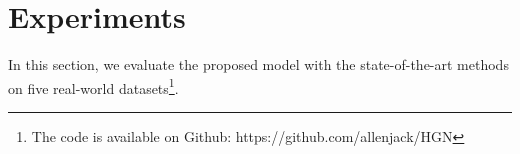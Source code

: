 \documentclass[sigconf]{acmart}
\begin{document}
\begin{comment}

\begin{algorithm}
  \textbf{Input}: $ \mathbf{X} $, $ \mathbf{R} $, $ \mathbf{C}^{(c)} $, $ \mathbf{C}^{(r)} $, $ \mathbf{P} $ \;
Initialize parameters $ \mathbf{W}_{*} $, $ \mathbf{w}_{t} $, $ \mathbf{b}_{*} $ \;
  numBatches = $ N $ $/$ $ batchSize $ \;
  \Repeat {convergence} {
    Shuffle($ \mathbf{X} $, $ \mathbf{R} $, $ \mathbf{C}^{(c)} $, $ \mathbf{C}^{(r)} $, $ \mathbf{P} $) \;
    \For{batch = 0; batch < numBatches; batch++} {
      $ \mathbf{X}_{batch}, \mathbf{R}_{batch}, \mathbf{C}_{batch}^{(c)}, \mathbf{C}_{batch}^{(r)} $ = ExtractBatchData(batch, $ \mathbf{X} $, $ \mathbf{R} $, $ \mathbf{C}^{(c)} $, $ \mathbf{C}^{(r)} $) \;
      For each item $ i $ in $ \mathbf{X}_{batch} $, apply Eq. \ref{eq:slice_operation} to get $ \mathbf{W}_{1}[D_{i}] $ \;
      Apply Eq. \ref{eq:attention_matrix}, Eq. \ref{eq:item_embedding_matrix} and Eq. \ref{eq:item_content_embedding} to get $ \mathbf{z}_{i}^{c} $ \;
      For each item $ i $ in $ \mathbf{R}_{batch} $, apply Eq. \ref{eq:rating_AE} to get $ \mathbf{z}_{i}^{r} $ \;
      Apply Eq. \ref{eq:gated_fusion} to fuse $ \mathbf{z}_{i}^{c} $ and $ \mathbf{z}_{i}^{r} $ to get $ \mathbf{z}_{i}^{g} $ \;
      Apply Eq. \ref{eq:neighbor_attention} to get $ i $'s neighborhood hidden representation $ \mathbf{z}_{j}^{g} $ based on $ \mathbf{P}_{i} $ \;
      Apply Eq. \ref{eq:rating_decoder} to get $ \hat{\mathbf{X}}_{batch} $ \;
      Apply Eq. \ref{eq:final_loss} to get $ \mathcal{L}_{batch} $ and backpropagate the error through the entire network \;
    }
  }

\caption{Joint Training Algorithm}
\label{alg:batch_training_algorithm}
\end{algorithm}

\end{comment}
 
\section{Experiments} \label{sec:evaluation}
In this section, we evaluate the proposed model with the state-of-the-art methods on five real-world datasets\footnote{The code is available on Github: https://github.com/allenjack/HGN}.
\end{document}
